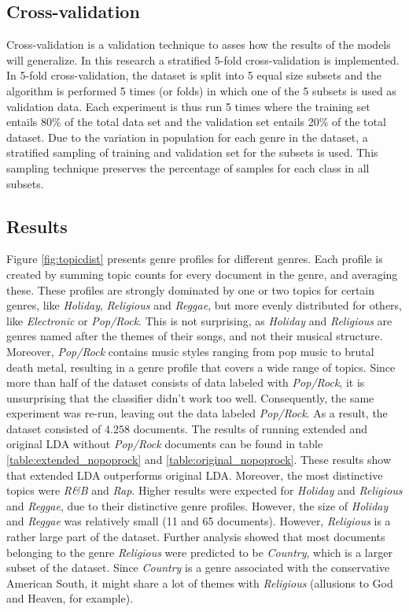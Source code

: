 \subsection{Cross-validation}\label{sec:fold}
Cross-validation is a validation technique to asses how the results of the models will generalize. In this research a stratified 5-fold cross-validation is implemented. In 5-fold cross-validation, the dataset is split into 5 equal size subsets and the algorithm is performed 5 times (or folds) in which one of the 5 subsets is used as validation data. Each experiment is thus run 5 times where the training set entails 80\% of the total data set and the validation set entails 20\% of the total dataset. Due to the variation in population for each genre in the dataset, a stratified sampling of training and validation set for the subsets is used. This sampling technique preserves the percentage of samples for each class in all subsets.



\subsection{Results}
Figure \ref{fig:topicdist} presents genre profiles for different genres. Each profile is created by summing topic counts for every document in the genre, and averaging these. These profiles are strongly dominated by one or two topics for certain genres, like \textit{Holiday}, \textit{Religious} and \textit{Reggae}, but more evenly distributed for others, like \textit{Electronic} or \textit{Pop/Rock}. This is not surprising, as \textit{Holiday} and \textit{Religious} are genres named after the themes of their songs, and not their musical structure. Moreover, \textit{Pop/Rock} contains music styles ranging from pop music to brutal death metal, resulting in a genre profile that covers a wide range of topics. Since more than half of the dataset consists of data labeled with \textit{Pop/Rock}, it is unsurprising that the classifier didn't work too well. 
Consequently, the same experiment was re-run, leaving out the data labeled \textit{Pop/Rock}. As a result, the dataset consisted of $4.258$ documents. The results of running extended and original LDA without \textit{Pop/Rock} documents can be found in table \ref{table:extended_nopoprock} and \ref{table:original_nopoprock}. These results show that extended LDA outperforms original LDA. Moreover, the most distinctive topics were \textit{R\&B} and \textit{Rap}. Higher results were expected for \textit{Holiday} and \textit{Religious} and \textit{Reggae}, due to their distinctive genre profiles. However, the size of \textit{Holiday} and \textit{Reggae} was relatively small (11 and 65 documents). However, \textit{Religious} is a rather large part of the dataset. Further analysis showed that most documents belonging to the genre \textit{Religious} were predicted to be \textit{Country}, which is a larger subset of the dataset. Since \textit{Country} is a genre associated with the conservative American South, it might share a lot of themes with \textit{Religious} (allusions to God and Heaven, for example).

\label{tab:onetable}


